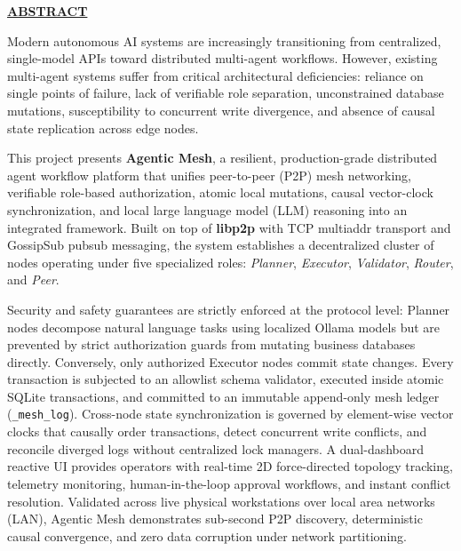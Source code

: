 \documentclass[12pt,a4paper]{report}
\begin{document}
\newpage
\begin{center}
    {\large \textbf{\underline{ABSTRACT}}}\\[20pt]
\end{center}

\noindent
Modern autonomous AI systems are increasingly transitioning from centralized, single-model APIs toward distributed multi-agent workflows. However, existing multi-agent systems suffer from critical architectural deficiencies: reliance on single points of failure, lack of verifiable role separation, unconstrained database mutations, susceptibility to concurrent write divergence, and absence of causal state replication across edge nodes.

This project presents \textbf{Agentic Mesh}, a resilient, production-grade distributed agent workflow platform that unifies peer-to-peer (P2P) mesh networking, verifiable role-based authorization, atomic local mutations, causal vector-clock synchronization, and local large language model (LLM) reasoning into an integrated framework. Built on top of \textbf{libp2p} with TCP multiaddr transport and GossipSub pubsub messaging, the system establishes a decentralized cluster of nodes operating under five specialized roles: \textit{Planner}, \textit{Executor}, \textit{Validator}, \textit{Router}, and \textit{Peer}.

Security and safety guarantees are strictly enforced at the protocol level: Planner nodes decompose natural language tasks using localized Ollama models but are prevented by strict authorization guards from mutating business databases directly. Conversely, only authorized Executor nodes commit state changes. Every transaction is subjected to an allowlist schema validator, executed inside atomic SQLite transactions, and committed to an immutable append-only mesh ledger (\texttt{\_mesh\_log}). Cross-node state synchronization is governed by element-wise vector clocks that causally order transactions, detect concurrent write conflicts, and reconcile diverged logs without centralized lock managers. A dual-dashboard reactive UI provides operators with real-time 2D force-directed topology tracking, telemetry monitoring, human-in-the-loop approval workflows, and instant conflict resolution. Validated across live physical workstations over local area networks (LAN), Agentic Mesh demonstrates sub-second P2P discovery, deterministic causal convergence, and zero data corruption under network partitioning.
\end{document}
